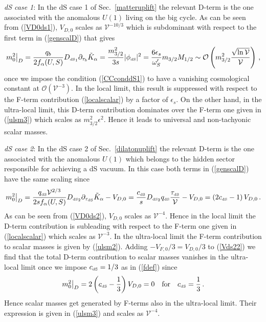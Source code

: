 \documentclass[11pt,a4paper]{article}
\newcommand{\be}{\begin{equation}}
\newcommand{\ee}{\end{equation}}
\def\dS{{\scriptscriptstyle \rm dS}}
\newcommand\vo{{\mathcal{V}}}
\newcommand{\mc}{\mathcal}
\begin{document}
\medskip
\emph{dS case 1}: In the dS case 1 of Sec.~\ref{matteruplift} the relevant D-term is the one associated with the anomalous $U(1)$ living on the big cycle.
As can be seen from (\ref{VD0ds1}), $V_{D,0}$ scales as $\vo^{-10/3}$ which is subdominant with respect to the first term in (\ref{genscalD}) that gives
\be
\left.m_0^2\right|_D = \frac{q_b}{2 f_\alpha(U,S)} D_{\dS_1} \partial_{\tau_b} \tilde{K}_{\alpha}= \frac{m_{3/2}^2}{3s}|\phi_\dS|^2
= \frac{6\epsilon_s}{\omega'_S}m_{3/2}M_{1/2}\sim  \mc{O}\left(m_{3/2}^2\frac{\sqrt{\ln\vo}}{\vo}\right)\,,
\label{sc1}
\ee
once we impose the condition (\ref{CCconddS1}) to have a vanishing cosmological constant at $\mc{O}(\vo^{-3})$.
In the local limit, this result is suppressed with respect to the F-term contribution (\ref{localscalar}) by a factor of $\epsilon_s$.
On the other hand, in the ultra-local limit, this D-term contribution dominates over the F-term one given in (\ref{ulsm3}) which scales as $m_{3/2}^2\epsilon^2$.
Hence it leads to universal and non-tachyonic scalar masses.

\medskip
\emph{dS case 2}: In the dS case 2 of Sec.~\ref{dilatonuplift} the relevant D-term is the one associated with the anomalous $U(1)$ which belongs to the hidden sector responsible for achieving a dS vacuum. In this case both terms in (\ref{genscalD}) have the same scaling since
\be
\left.m_0^2\right|_D = \frac{q_\dS \vo^{2/3}}{2 s f_\alpha(U,S)} D_{\dS_2} \partial_{\tau_\dS} \tilde{K}_{\alpha}-V_{D,0}
= \frac{c_\dS}{s} D_{\dS_2} q_\dS\frac{\tau_\dS}{\vo} -V_{D,0} = \left(2c_\dS-1\right)V_{D,0}\,.
\label{Vds22}
\ee
As can be seen from (\ref{VD0ds2}), $V_{D,0}$ scales as $\vo^{-4}$. Hence in the local limit the D-term contribution
is subleading with respect to the F-term one given in (\ref{localscalar}) which scales as $\vo^{-3}$.
In the ultra-local limit the F-term contribution to scalar masses is given by (\ref{ulsm2}).
Adding $-V_{F,0}/3= V_{D,0}/3$ to (\ref{Vds22}) we find that the total D-term contribution to scalar masses vanishes in the ultra-local limit once we impose $c_\dS=1/3$ as in (\ref{fdef}) since
\be
\left.m_0^2\right|_D =  2\left(c_\dS-\frac 13\right)V_{D,0}=0 \quad\text{for}\quad c_\dS=\frac 13\,.
\label{Vds2}
\ee
Hence scalar masses get generated by F-terms also in the ultra-local limit.
Their expression is given in (\ref{ulsm3}) and scales as $\vo^{-4}$.\\
\end{document}
